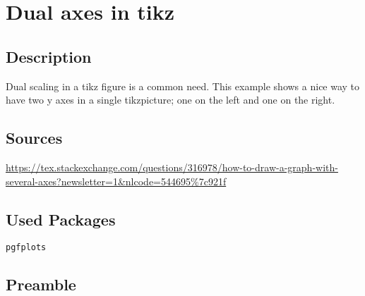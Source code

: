 \documentclass{article}
\begin{document}
\section*{Dual axes in tikz}

\subsection*{Description}
Dual scaling in a tikz figure is a common need. This example shows a nice way to have two y axes in a single tikzpicture; one on the left and one on the right.

\subsection*{Sources}
\url{https://tex.stackexchange.com/questions/316978/how-to-draw-a-graph-with-several-axes?newsletter=1&nlcode=544695%7c921f}

\subsection*{Used Packages}
\verb|pgfplots|

\subsection*{Preamble}
\begin{latex}
\usepackage{pgfplots}
\usetikzlibrary{arrows}

\pgfplotsset{width=8cm, compat=1.13}
\end{latex}
\end{document}
